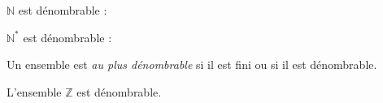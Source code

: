 \documentclass[a4paper,10pt]{report}
\begin{document}
\medskip

\begin{exems}
\item $\mathbb{N}$ est dénombrable : 
\item $\mathbb{N}^*$ est dénombrable : 
\end{exems}

\medskip

\begin{defin} Un ensemble est \textit{au plus dénombrable} si il est fini ou si il est dénombrable.
\end{defin}

\begin{prop} L'ensemble $\mathbb{Z}$ est dénombrable.
\end{prop}

\begin{preuve} 
%
\vspace{8.5cm}
\end{preuve}

\newpage

$\phantom{test}$
\end{document}
